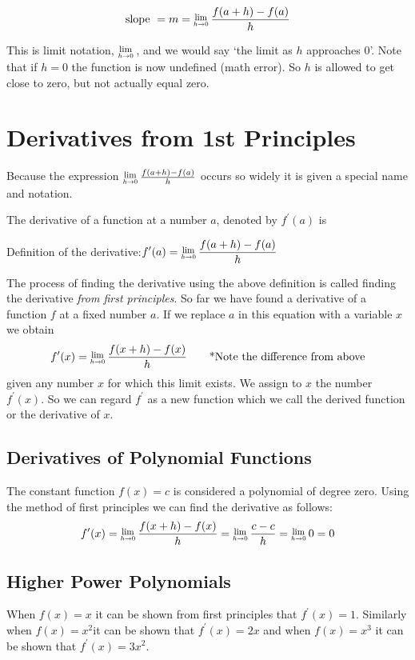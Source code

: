 \begin{tcolorbox}
$$\text{slope }=m=\Lim{h\to 0} \frac{f(a+h)-f(a)}{h}$$
\end{tcolorbox}
This is limit notation, $\Lim{h\to 0} $, and we would say `the limit as $h$ approaches $0$'. Note that if $h=0$ the function is now undefined (math error). So $h$ is allowed to get close to zero, but not actually equal zero.



\section{Derivatives from 1st Principles}
Because the expression $\Lim{h \to 0}\frac{f (a +h) -f (a)}{h}$ occurs so widely it is given a special name and notation. 

The derivative of a function at a number $a$, denoted by $f^{ \prime } (a)$ is 
\begin{tcolorbox}
Definition of the derivative:\qquad$\displaystyle f^{ \prime } (a) =\Lim{h \to 0}\frac{f (a +h) -f (a)}{h}$
\end{tcolorbox}

The process of finding the derivative using the above definition is called finding the derivative \textit{from first principles}. So far we have found a derivative of a function $f$ at a fixed number $a$. If we replace $a$ in this equation with a variable $x$ we obtain 
\[f^{ \prime } (x) =\Lim{h \to 0}\frac{f (x +h) -f (x)}{h}\tag*{*Note the difference from above}\]
given any number $x$ for which this limit exists. We assign to $x$ the number $f^{ \prime } \left (x\right )$. So we can regard $f^{ \prime }$ as a new function which we call the derived function or the derivative of $x$. 

\subsection*{Derivatives of Polynomial Functions}
The constant function $f (x) =c$ is considered a polynomial of degree zero. Using the method of first principles we can find the derivative as follows: 
$$f^{ \prime } (x) =\Lim{h\to 0}\frac{f (x +h) -f (x)}{h} =\Lim{h\to 0}\frac{c -c}{h} =\Lim{h\to 0}0 =0$$

\subsection*{Higher Power Polynomials}
When $f (x) =x$ it can be shown from first principles that $f^{ \prime } (x) =1$. Similarly when $f (x) =x^{2\text{}}$it can be shown that $f^{ \prime } (x) =2 x$ and when $f (x) =x^{3}$ it can be shown that $f^{ \prime } (x) =3 x^{2}$. 

